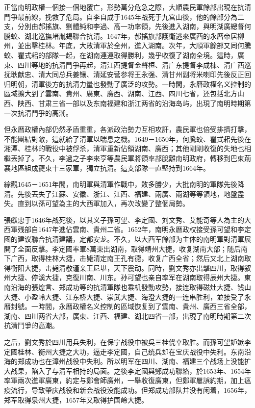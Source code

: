 正當南明政權一個接一個地覆亡，形勢萬分危急之際，大順農民軍餘部出現在抗清鬥爭最前線，挽救了危局。自李自成于1645年战死于九宫山後，他的餘部分為二支，分別由郝搖旗、劉體純和李過、高一功率領，先後進入湖南，與明湖廣總督何騰蛟、湖北巡撫堵胤錫聯合抗清。1647年，郝搖旗部護衛逃來廣西的永曆帝居柳州，並出擊桂林。年底，大敗清軍於全州，進入湖南。次年，大順軍餘部又同何騰蛟、瞿式耜的部隊一起，在湖南連連取得勝利，幾乎收復了湖南全境。這時，廣東、四川等地的抗清鬥爭再起，清江西提督金聲桓、清广东提督李成棟、清广西巡抚耿献忠、清大同总兵姜镶、清延安营参将王永强、清甘州副将米喇印先後反正回归明朝，清軍後方的抗清力量也發動了廣泛的攻勢。一時間，永曆政權名义控制的區域擴大到了雲南、貴州、廣東、廣西、湖南、江西、四川七省，还包括北方山西、陕西、甘肃三省一部以及东南福建和浙江两省的沿海岛屿，出現了南明時期第一次抗清鬥爭的高潮。

但永曆政權內部仍然矛盾重重，各派政治勢力互相攻訐，農民軍也倍受排擠打擊，不能團結對敵，這就給了清軍以喘息之機。1649－1650年，何騰蛟、瞿式耜先後在湘潭、桂林的戰役中被俘杀，清軍重新佔領湖南、廣西；其他剛剛收復的失地也相繼丟掉了。不久，李過之子李來亨等農民軍將領率部脫離南明政府，轉移到巴東荊襄地區組成夔東十三家軍，獨立抗清。這支部隊一直堅持到1664年。

綜觀1645－1651年間，南明軍與清軍作戰中，敗多勝少，大批南明的軍隊先後降清。先後丟失了江蘇、安徽、浙江、江西、福建、兩廣、兩湖等等領地，地盤盡失。直到以孫可望為主的大西軍加入，再次改變了整個局勢。

張獻忠于1646年战死後，以其义子孫可望、李定國、刘文秀、艾能奇等人為主的大西軍残部自1647年進佔雲南、貴州二省。1652年，南明永曆政权接受孫可望和李定國的建议聯合抗清建議，定都安龙。不久，以大西军餘部为主体的南明軍對清軍展開了全面反擊。李定國率軍8萬東出湖南，取得靖州大捷，收复湖南大部；随后南下广西，取得桂林大捷，击毙清定南王孔有德，收复广西全省；然后又北上湖南取得衡阳大捷，击毙清敬谨亲王尼堪，天下震动。同時，劉文秀亦出擊四川，取得叙州大捷、停溪大捷，克復川南、川东。孙可望也亲自率军在湖南取得辰州大捷。東南沿海的張煌言、郑成功等的抗清軍隊也乘机發動攻勢，接连取得磁灶大捷、钱山大捷、小盈岭大捷、江东桥大捷、崇武大捷、海澄大捷的一连串胜利，並接受了永曆封號。一時間，永曆政權名义控制的區域恢复到了雲南、貴州、廣西三省全部，湖南、四川两省大部，廣東、江西、福建、湖北四省一部，出現了南明時期第二次抗清鬥爭的高潮。

之后，劉文秀於四川用兵失利，在保宁战役中被吳三桂侥幸取胜。而孫可望妒嫉李定國桂林、衡州大捷之大功，逼走李定國，自己统兵却在宝庆战役中失利。东南沿海的郑成功也在漳州战役中失利。所以明军在四川、湖南、福建三个战场上没能扩大战果，陷入了与清军相持的局面。之後李定國與鄭成功聯絡，於1653年、1654年率軍兩次進軍廣東，約定与鄭會師廣州，一舉收復廣東，但鄭軍屢誤約期，加上瘟疫流行，导致肇庆战役和新会战役没能成功。但郑成功部队并没有闲着，1656年，郑军取得泉州大捷，1657年又取得护国岭大捷。

